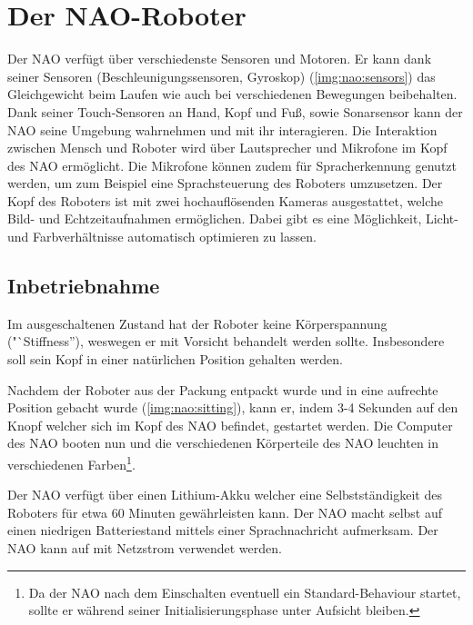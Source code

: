 \chapter{Der NAO-Roboter}

    Der NAO verfügt über verschiedenste Sensoren und Motoren.
    Er kann dank seiner Sensoren (Beschleunigungssensoren, Gyroskop)
    (\autoref{img:nao:sensors}) das Gleichgewicht
    beim Laufen wie auch bei verschiedenen Bewegungen beibehalten.
    Dank seiner Touch-Sensoren an Hand, Kopf und Fuß, sowie Sonarsensor kann der
    NAO seine Umgebung wahrnehmen und mit ihr interagieren.
    Die Interaktion zwischen Mensch und Roboter wird über Lautsprecher und
    Mikrofone im Kopf des NAO ermöglicht.
    Die Mikrofone können zudem für Spracherkennung genutzt werden, um zum
    Beispiel eine Sprachsteuerung des Roboters umzusetzen.
    Der Kopf des Roboters ist mit zwei hochauflösenden Kameras ausgestattet,
    welche Bild- und Echtzeitaufnahmen ermöglichen.
    Dabei gibt es eine Möglichkeit, Licht- und Farbverhältnisse automatisch
    optimieren zu lassen.

    \section{Inbetriebnahme}

        Im ausgeschaltenen Zustand hat der Roboter keine Körperspannung
        ("`Stiffness''), weswegen er mit Vorsicht behandelt werden sollte.
        Insbesondere soll sein Kopf in einer natürlichen Position gehalten
        werden.

        Nachdem der Roboter aus der Packung entpackt wurde und in eine aufrechte
        Position gebacht wurde (\autoref{img:nao:sitting}), kann er, indem 3-4
        Sekunden auf den Knopf welcher sich im Kopf des NAO befindet, gestartet
        werden.
        Die Computer des NAO booten nun und die verschiedenen Körperteile des
        NAO leuchten in verschiedenen Farben\footnote{
            Da der NAO nach dem Einschalten eventuell ein Standard-Behaviour
            startet, sollte er während seiner Initialisierungsphase unter
            Aufsicht bleiben.
        }.

        Der NAO verfügt über einen Lithium-Akku welcher eine Selbstständigkeit
        des Roboters für etwa 60 Minuten gewährleisten kann.
        Der NAO macht selbst auf einen niedrigen Batteriestand mittels einer
        Sprachnachricht aufmerksam. Der NAO kann auf mit Netzstrom verwendet
        werden.

